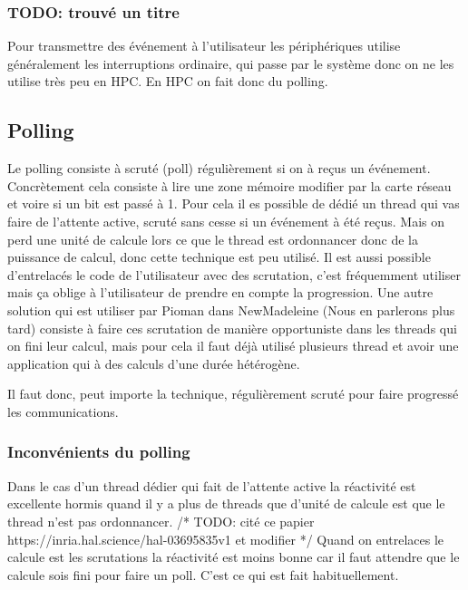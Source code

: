 \subsubsection{TODO: trouvé un titre}

Pour transmettre des événement à l'utilisateur les périphériques utilise généralement les interruptions ordinaire, qui passe par le système donc on ne les utilise très peu en HPC.
En HPC on fait donc du polling.

\subsection{Polling}

Le polling consiste à scruté (poll) régulièrement si on à reçus un événement.
Concrètement cela consiste à lire une zone mémoire modifier par la carte réseau et voire si un bit est passé à 1.
Pour cela il es possible de dédié un thread qui vas faire de l'attente active, scruté sans cesse si un événement à été reçus.
Mais on perd une unité de calcule lors ce que le thread est ordonnancer donc de la puissance de calcul, donc cette technique est peu utilisé. %
Il est aussi possible d'entrelacés le code de l'utilisateur avec des scrutation, c'est fréquemment utiliser mais ça oblige à l'utilisateur de prendre en compte la progression.
Une autre solution qui est utiliser par Pioman dans NewMadeleine (Nous en parlerons plus tard) consiste à faire ces scrutation de manière opportuniste dans les threads qui on fini leur calcul, mais pour cela il faut déjà utilisé plusieurs thread et avoir une application qui à des calculs d'une durée hétérogène.

Il faut donc, peut importe la technique, régulièrement scruté pour faire progressé les communications.

\subsubsection{Inconvénients du polling}


Dans le cas d'un thread dédier qui fait de l'attente active la réactivité est excellente hormis quand il y a plus de threads que d'unité de calcule est que le thread n'est pas ordonnancer.
/* TODO: cité ce papier https://inria.hal.science/hal-03695835v1 et modifier */
Quand on entrelaces le calcule est les scrutations la réactivité est moins bonne car il faut attendre que le calcule sois fini pour faire un poll.
C'est ce qui est fait habituellement.

